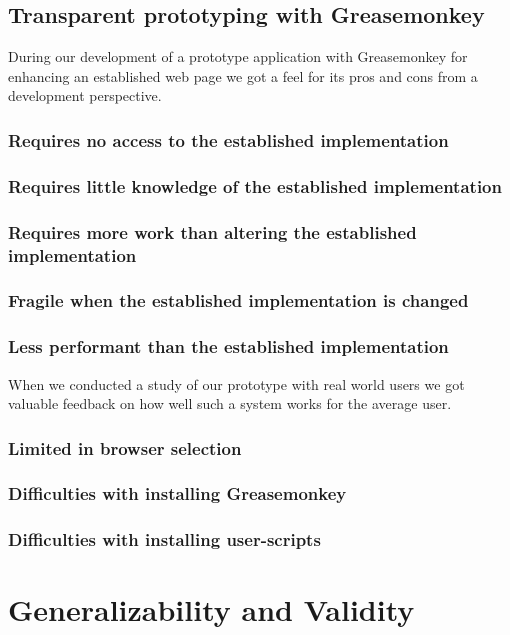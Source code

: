 \subsection{Transparent prototyping with Greasemonkey}

During our development of a prototype application with Greasemonkey for
enhancing an established web page we got a feel for its pros and cons from a
development perspective.

\subsubsection{Requires no access to the established implementation}

\subsubsection{Requires little knowledge of the established implementation}

\subsubsection{Requires more work than altering the established
  implementation}

\subsubsection{Fragile when the established implementation is changed}

\subsubsection{Less performant than the established implementation}

\parabreak

When we conducted a study of our prototype with real world users
we got valuable feedback on how well such a system works for the average user.

\subsubsection{Limited in browser selection}

\subsubsection{Difficulties with installing Greasemonkey}

\subsubsection{Difficulties with installing user-scripts}

\section{Generalizability and Validity}
